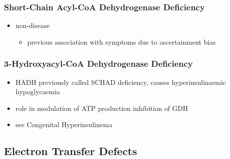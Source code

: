 \documentclass[12pt]{scrartcl}
\begin{document}
\subsubsection{Short-Chain Acyl-CoA Dehydrogenase Deficiency}
\label{sec:orgdc51e90}
\begin{itemize}
\item non-disease
\begin{itemize}
\item previous association with symptoms due to ascertainment bias
\end{itemize}
\end{itemize}

\subsubsection{3-Hydroxyacyl-CoA Dehydrogenase Deficiency}
\label{sec:org347ddad}
\begin{itemize}
\item HADH previously called SCHAD deficiency, causes hyperinsulinaemic
hypoglycaemia
\item role in modulation of ATP production inhibition of GDH
\item see Congenital Hyperinsulinema
\end{itemize}
\subsection{Electron Transfer Defects}
\label{sec:org5c76bce}
\end{document}
